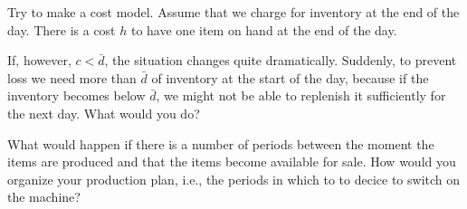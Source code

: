 \begin{exercise}
  Try to make a cost model. Assume that we charge for inventory at the
  end of the day.  There is a cost $h$ to have one item on hand at the
  end of the day.

\end{exercise}

\begin{exercise}
  If, however, $c< \bar d$, the situation changes quite
  dramatically. Suddenly, to prevent loss we need more than $\bar d$
  of inventory at the start of the day, because if the inventory
  becomes below $\bar d$, we might not be able to replenish it
  sufficiently for the next day. What would you do?

\end{exercise}

\begin{exercise}
  What would happen if there is a number of periods between the moment
  the items are produced and that the items become available for
  sale.  How would you organize your production plan, i.e., the periods in which to to decice to switch on the machine? 

\end{exercise}

